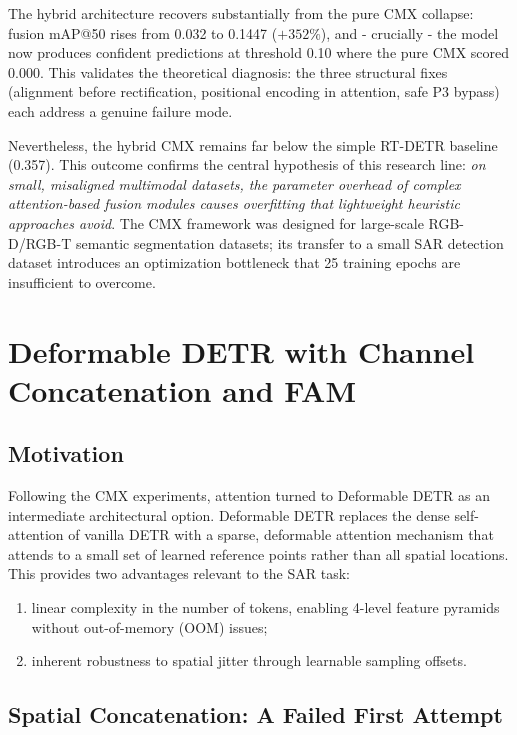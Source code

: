 \documentclass[12pt, a4paper]{article}
\begin{document}
The hybrid architecture recovers substantially from the pure CMX collapse: fusion mAP@50 rises from 0.032 to 0.1447 ($+352\%$), and - crucially - the model now produces confident predictions at threshold 0.10 where the pure CMX scored 0.000. This validates the theoretical diagnosis: the three structural fixes (alignment before rectification, positional encoding in attention, safe P3 bypass) each address a genuine failure mode.

Nevertheless, the hybrid CMX remains far below the simple RT-DETR baseline (0.357). This outcome confirms the central hypothesis of this research line: \textit{on small, misaligned multimodal datasets, the parameter overhead of complex attention-based fusion modules causes overfitting that lightweight heuristic approaches avoid}. The CMX framework was designed for large-scale RGB-D/RGB-T semantic segmentation datasets; its transfer to a small SAR detection dataset introduces an optimization bottleneck that 25 training epochs are insufficient to overcome.

\section{Deformable DETR with Channel Concatenation and FAM}
\label{sec:def_detr}

\subsection{Motivation}

Following the CMX experiments, attention turned to Deformable DETR \cite{zhu2020deformable} as an intermediate architectural option. Deformable DETR replaces the dense self-attention of vanilla DETR with a sparse, deformable attention mechanism that attends to a small set of learned reference points rather than all spatial locations. This provides two advantages relevant to the SAR task: 
\begin{enumerate}
    \item linear complexity in the number of tokens, enabling 4-level feature pyramids without out-of-memory (OOM) issues;
    \item inherent robustness to spatial jitter through learnable sampling offsets.
\end{enumerate}
\subsection{Spatial Concatenation: A Failed First Attempt}
\end{document}

